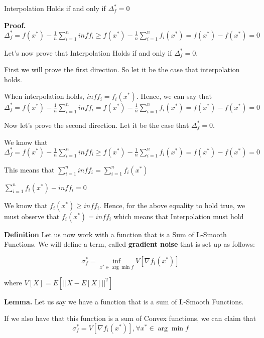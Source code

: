 Interpolation Holds if and only if $\Delta^*_f = 0$ 

\noindent \textbf{Proof.} $\Delta^*_f = f(x^*) - \frac{1}{n} \sum_{i=1}^{n} inf f_i \geq f(x^*) - \frac{1}{n} \sum_{i=1}^{n} f_i(x^*) = f(x^*) - f(x^*) = 0$

Let's now prove that Interpolation Holds if and only if $\Delta^*_f = 0$. 

First we will prove the first direction. So let it be the case that interpolation holds. 

When interpolation holds, $inf f_i = f_i(x^*)$. Hence, we can say that $\Delta^*_f = f(x^*) - \frac{1}{n} \sum_{i=1}^{n} inf f_i = f(x^*) - \frac{1}{n} \sum_{i=1}^{n} f_i(x^*) = f(x^*) - f(x^*) = 0$

Now let's prove the second direction. Let it be the case that $\Delta^*_f = 0$. 

We know that $\Delta^*_f = f(x^*) - \frac{1}{n} \sum_{i=1}^{n} inf f_i \geq f(x^*) - \frac{1}{n} \sum_{i=1}^{n} f_i(x^*) = f(x^*) - f(x^*) = 0$ \newline 

This means that $\sum_{i=1}^{n} inf f_i = \sum_{i=1}^{n} f_i(x^*)$ \newline 

$\sum_{i=1}^{n} f_i(x^*) - inf f_i = 0$ \newline 

We know that $f_i(x^*) \geq inf f_i$. Hence, for the above equality to hold true, we must observe that $f_i(x^*) = inf f_i$ which means that Interpolation must hold

\noindent \textbf{Definition} Let us now work with a function that is a Sum of L-Smooth Functions. We will define a term, called \textbf{gradient noise} that is set up as follows: 

\begin{equation}
    \sigma_f^* = \inf_{x^* \in \arg \min f} V[\nabla f_i(x^*)]
\end{equation}

where $V[X] = E[|| X - E[X] ||^2]$ \newline 

\noindent \textbf{Lemma.} Let us say we have a function that is a sum of L-Smooth Functions. 

If we also have that this function is a sum of Convex functions, we can claim that 
\begin{equation}
    \sigma_f^* = V[\nabla f_i(x^*)], \forall x^* \in \arg \min f
\end{equation}

